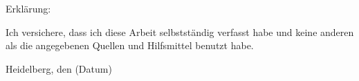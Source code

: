 \setlength{\parindent}{0em}

Erkl\"{a}rung:\par
\vspace{3\baselineskip}
Ich versichere, dass ich diese Arbeit selbstst\"{a}ndig verfasst habe und keine
anderen als die angegebenen Quellen und Hilfsmittel benutzt habe.\par
\vspace{5\baselineskip}
Heidelberg, den (Datum)\hspace{3cm}\dotfill